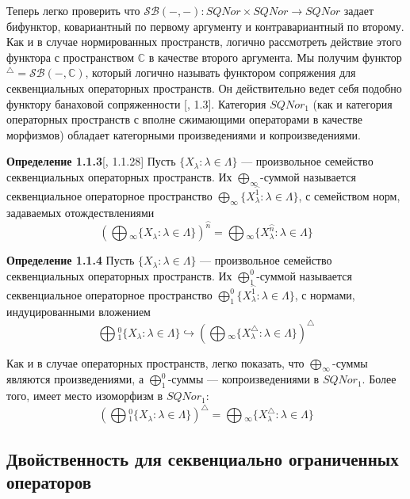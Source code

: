 \documentclass[12pt]{article}
\begin{document}
\medskip

Теперь легко проверить что $\mathcal{SB}(-,-):SQNor\times SQNor\to SQNor$ задает бифунктор, ковариантный по первому аргументу и контравариантный по второму. Как и в случае нормированных пространств, логично рассмотреть действие этого функтора с пространством $\mathbb{C}$ в качестве второго аргумента. Мы получим функтор ${}^\triangle=\mathcal{SB}(-,\mathbb{C})$, который логично называть функтором сопряжения для секвенциальных операторных пространств. Он действительно  ведет себя подобно функтору банаховой сопряженности [\cite{LamOpFolgen}, 1.3]. Категория $SQNor_1$  (как и категория операторных пространств с вполне сжимающими операторами в качестве морфизмов) обладает категорными произведениями и копроизведениями. 

\medskip

{\bf Определение 1.1.3}[\cite{LamOpFolgen}, 1.1.28]\label{DefSQProd}
Пусть $\{X_\lambda: \lambda \in \Lambda\}$ --- произвольное семейство секвенциальных операторных пространств. Их $\bigoplus_\infty$-суммой называется секвенциальное операторное пространство 
$\bigoplus_\infty\{X_\lambda^{\wideparen{1}}:\lambda\in \Lambda\}$, с семейством норм, задаваемых отождествлениями 
$$
\left(\bigoplus{}_\infty\{X_\lambda:\lambda \in \Lambda\}\right)^{\wideparen{n}}
=\bigoplus{}_\infty\{X_\lambda^{\wideparen{n}}:\lambda\in \Lambda\}
$$

\medskip

{\bf Определение 1.1.4}\label{DefSQCoProd}
Пусть $\{X_\lambda: \lambda \in \Lambda\}$ --- произвольное семейство секвенциальных операторных пространств. Их $\bigoplus_1^0$-суммой называется секвенциальное операторное пространство  
$\bigoplus_1^0\{X_\lambda^{\wideparen{1}}:\lambda\in \Lambda\}$, с нормами, индуцированными вложением
$$
\bigoplus{}_1^0\{X_\lambda:\lambda \in \Lambda\}\hookrightarrow
\left(\bigoplus{}_\infty\{X_\lambda^\triangle:\lambda\in \Lambda\}\right)^\triangle
$$

\medskip

Как и в случае операторных пространств, легко показать, что $\bigoplus_\infty$-суммы являются произведениями, а $\bigoplus_1^0$-суммы --- копроизведениями в $SQNor_1$. Более того, имеет место изоморфизм в $SQNor_1$:
$$
\left(\bigoplus{}_1^0\{X_\lambda:\lambda\in \Lambda\}\right)^\triangle
=\bigoplus{}_\infty\{X_\lambda^\triangle:\lambda\in \Lambda\}
$$


\subsection{Двойственность для секвенциально ограниченных операторов}
\end{document}
